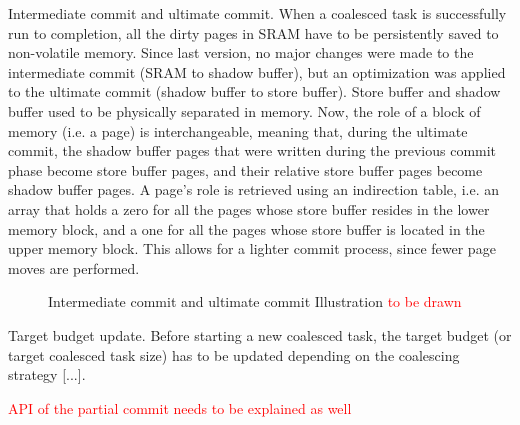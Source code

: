 Intermediate commit and ultimate commit. When a coalesced task is successfully run to completion, all the dirty pages in SRAM have to be persistently saved to non-volatile memory. Since last version, no major changes were made to the intermediate commit (SRAM to shadow buffer), but an optimization was applied to the ultimate commit (shadow buffer to store buffer). Store buffer and shadow buffer used to be physically separated in memory. Now, the role of a block of memory (i.e. a page) is interchangeable, meaning that, during the ultimate commit, the shadow buffer pages that were written during the previous commit phase become store buffer pages, and their relative store buffer pages become shadow buffer pages. A page’s role is retrieved using an indirection table, i.e. an array that holds a zero for all the pages whose store buffer resides in the lower memory block, and a one for all the pages whose store buffer is located in the upper memory block. This allows for a lighter commit process, since fewer page moves are performed.

\begin{figure}
	\caption{Intermediate commit and ultimate commit Illustration \textcolor{red}{to be drawn}}
\end{figure}

Target budget update. Before starting a new coalesced task, the target budget (or target coalesced task size) has to be updated depending on the coalescing strategy [...].

\textcolor{red}{API of the partial commit needs to be explained as well}